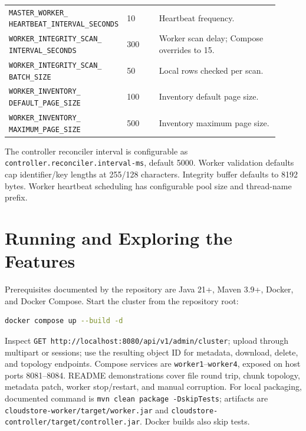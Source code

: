 \documentclass[11pt,a4paper]{article}
\begin{document}
\begin{longtable}{p{0.34\linewidth}p{0.12\linewidth}p{0.45\linewidth}}
\makecell[l]{\texttt{MASTER\_WORKER\_}\\\texttt{HEARTBEAT\_INTERVAL\_SECONDS}} & 10 & Heartbeat frequency.\\
\makecell[l]{\texttt{WORKER\_INTEGRITY\_SCAN\_}\\\texttt{INTERVAL\_SECONDS}} & 300 & Worker scan delay; Compose overrides to 15.\\
\makecell[l]{\texttt{WORKER\_INTEGRITY\_SCAN\_}\\\texttt{BATCH\_SIZE}} & 50 & Local rows checked per scan.\\
\makecell[l]{\texttt{WORKER\_INVENTORY\_}\\\texttt{DEFAULT\_PAGE\_SIZE}} & 100 & Inventory default page size.\\
\makecell[l]{\texttt{WORKER\_INVENTORY\_}\\\texttt{MAXIMUM\_PAGE\_SIZE}} & 500 & Inventory maximum page size.\\
\bottomrule
\end{longtable}
The controller reconciler interval is configurable as \texttt{controller.reconciler.interval-ms}, default 5000. Worker validation defaults cap identifier/key lengths at 255/128 characters. Integrity buffer defaults to 8192 bytes. Worker heartbeat scheduling has configurable pool size and thread-name prefix.

\section{Running and Exploring the Features}
Prerequisites documented by the repository are Java 21+, Maven 3.9+, Docker, and Docker Compose. Start the cluster from the repository root:
\begin{lstlisting}[language=bash]
docker compose up --build -d
\end{lstlisting}
Inspect \texttt{GET http://localhost:8080/api/v1/admin/cluster}; upload through multipart or sessions; use the resulting object ID for metadata, download, delete, and topology endpoints. Compose services are \texttt{worker1}--\texttt{worker4}, exposed on host ports 8081--8084. README demonstrations cover file round trip, chunk topology, metadata patch, worker stop/restart, and manual corruption. For local packaging, documented command is \texttt{mvn clean package -DskipTests}; artifacts are \texttt{cloudstore-worker/target/worker.jar} and \texttt{cloudstore-controller/target/controller.jar}. Docker builds also skip tests.
\end{document}
